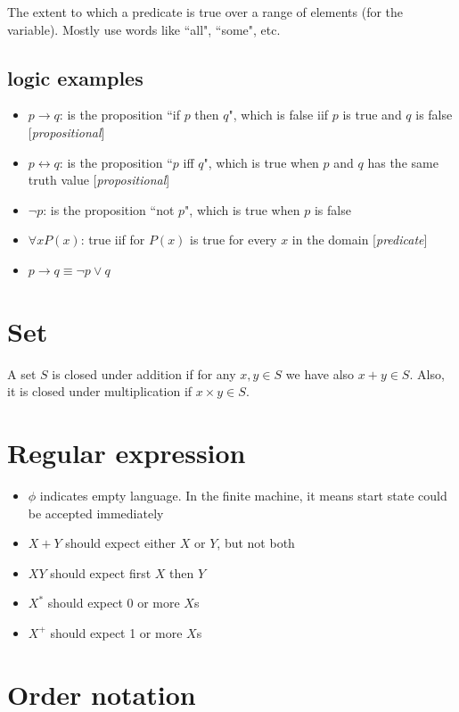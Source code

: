 \documentclass[11pt, oneside]{article}   	%
\begin{document}
The extent to which a predicate is true over a range of elements (for the variable). Mostly use words like ``all", ``some", etc.

\subsection{logic examples}

\begin{itemize}
\item $p \rightarrow q$: is the proposition ``if $p$ then $q$", which is false iif $p$ is true and $q$ is false [\textit{propositional}]
\item $p \leftrightarrow q$: is the proposition ``$p$ iff $q$", which is true when $p$ and $q$ has the same truth value [\textit{propositional}]
\item $\neg p$: is the proposition ``not $p$", which is true when $p$ is false
\item $\forall xP(x)$: true iif for $P(x)$ is true for every $x$ in the domain [\textit{predicate}]
\item $p \rightarrow q \equiv \neg p \vee q$
\end{itemize}

\section{Set}

A set $S$ is closed under addition if for any $x,y \in S$ we have also $x+y \in S$. Also, it is closed under multiplication if $x \times y \in S$.

\section{Regular expression}

\begin{itemize}
\item $\phi$ indicates empty language. In the finite machine, it means start state could be accepted immediately
\item $X+Y$ should expect either $X$ or $Y$, but not both
\item $XY$ should expect first $X$ then $Y$
\item $X^*$ should expect 0 or more $X$s
\item $X^+$ should expect 1 or more $X$s
\end{itemize}

\section{Order notation}
\end{document}
